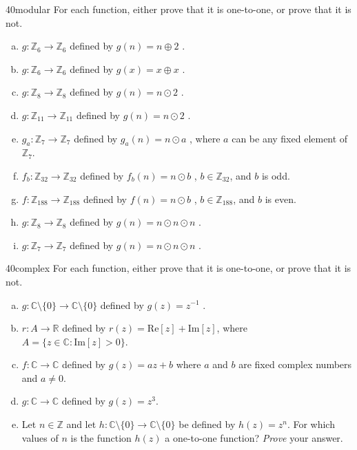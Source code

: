 \begin{exercise}{40modular} 
For each function, either prove that it is one-to-one, or prove that it is not.
\begin{enumerate}[(a)]
\item \label{modular_g}
 $g \colon {\mathbb Z}_6 \to {\mathbb Z}_6$ defined by $g(n)= n \oplus 2$ .
 \item \label{modular_g1}
$g \colon {\mathbb Z}_6 \to {\mathbb Z}_{6}$ defined by $g(x) =  x \oplus x$ .
\item \label{modular_m}
 $g \colon {\mathbb Z}_8 \to {\mathbb Z}_8$ defined by $g(n) = n \odot 2 $ .
\item \label{modular_m2}
 $g \colon {\mathbb Z}_{11} \to {\mathbb Z}_{11}$ defined by $g(n) =  n \odot 2$ .
\item 
 $g_a \colon {\mathbb Z}_7 \to {\mathbb Z}_7$ defined by $g_a(n)= n \odot a$ , where $a$ can be any 
fixed element of ${\mathbb Z}_7$.
\item
 $f_b \colon {\mathbb Z}_{32} \to {\mathbb Z}_{32}$ defined by $f_b(n)= n \odot b$ ,  $b \in {\mathbb Z}_{32}$, and $b$ is odd. 
\item
 $f \colon {\mathbb Z}_{188} \to {\mathbb Z}_{188}$ defined by $f(n)= n \odot b$ ,  $b \in {\mathbb Z}_{188}$, and $b$ is even. 
\item 
 $g \colon {\mathbb Z}_8 \to {\mathbb Z}_8$ defined by $g(n)= n \odot n \odot n$ .
\item 
 $g \colon {\mathbb Z}_7 \to {\mathbb Z}_7$ defined by $g(n)= n \odot n \odot n$ .
\end{enumerate}
\end{exercise}


\begin{exercise}{40complex} 
For each function, either prove that it is one-to-one, or prove that it is not.
\begin{enumerate}[(a)]
\item
 $g \colon {\mathbb C}\setminus \{0\}  \to {\mathbb C}\setminus \{0\} $ defined by $g(z) =  z^{-1}$ .
\item
 $r \colon A  \to {\mathbb R} $ defined by  
$r(z) = \text{Re}[z] + \text{Im}[z]$, where \\
 $A = \{ z \in  \mathbb{C}: \text{Im}[z] > 0 \}$. 
\item
$f: {\mathbb C} \to {\mathbb C}$ defined by $g(z) = az + b$ where $a$ and $b$ are fixed complex numbers and $a \neq 0$.
\item
$g: {\mathbb C} \to {\mathbb C}$ defined by $g(z) = z^3$.
\item
Let $n \in {\mathbb Z}$ and let $h: \mathbb{C} \setminus \{0\} \to \mathbb{C} \setminus \{0\}$ be defined by $h(z) = z^n$.  For which values of $n$ is 
the function $h(z)$ a one-to-one function?  \emph{Prove} your answer.
 \end{enumerate}
\end{exercise}

